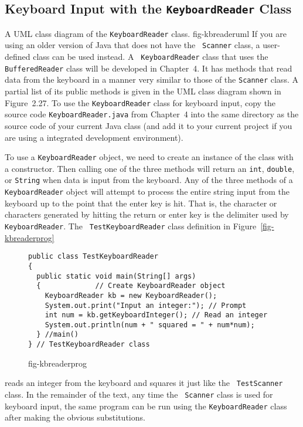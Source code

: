 \subsection{Keyboard Input with the {\tt KeyboardReader} Class} 

{A UML class diagram of the {\tt KeyboardReader} class.}
{fig-kbreaderuml}
If you are using an older version of Java that does not have the {\tt
Scanner} class, a user-defined class can be used instead.  A {\tt
KeyboardReader} class that uses the {\tt BufferedReader} class will be
developed in Chapter~4.  It has methods that read data from the
keyboard in a manner very similar to those of the {\tt Scanner} class.
A partial list of its public methods is given in the UML class diagram
shown in Figure~2.27.  To use the {\tt KeyboardReader} class for
keyboard input, copy the source code {\tt KeyboardReader.java} from
Chapter~4 into the same directory as the source code of your current
Java class (and add it to your current project if you are using a
integrated development environment).

To use a {\tt KeyboardReader} object, we need to create an instance 
of the class with a constructor. Then calling one of the three methods 
will return an {\tt int}, {\tt double}, or {\tt String} when data
is input from the keyboard.  Any of the three methods of a {\tt
KeyboardReader} object will attempt to process the entire string input
from the keyboard up to the point that the enter key is hit. That is,
the character or characters generated by hitting the return or enter
key is the delimiter used by {\tt KeyboardReader}.  The {\tt
TestKeyboardReader} class definition in Figure~\ref{fig-kbreaderprog}
\begin{figure}[htb]
\jjjprogstart
\begin{jjjlisting}
\begin{lstlisting}
public class TestKeyboardReader 
{
  public static void main(String[] args) 
  {             // Create KeyboardReader object
    KeyboardReader kb = new KeyboardReader(); 
    System.out.print("Input an integer:"); // Prompt
    int num = kb.getKeyboardInteger(); // Read an integer
    System.out.println(num + " squared = " + num*num);
  } //main()
} // TestKeyboardReader class
\end{lstlisting}
\end{jjjlisting}
{fig-kbreaderprog}
\end{figure}
reads an integer from the keyboard and squares it just like the {\tt
TestScanner} class.  In the remainder of the text, any time the {\tt
Scanner} class is used for keyboard input, the same program can be run
using the {\tt KeyboardReader} class after making the obvious
substitutions.


